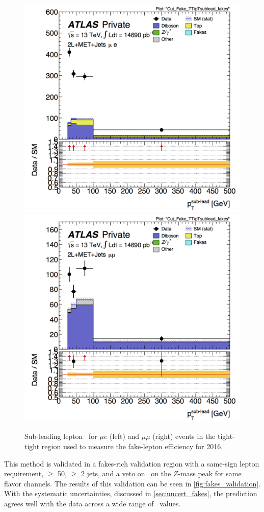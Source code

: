 \begin{centering}
\begin{figure}[htbp]
\centering
\includegraphics[width=.45\textwidth]{figures/fakes/me-Cut_Fake_TT-pTsublead_fakes-lin_2016.png}
\includegraphics[width=.45\textwidth]{figures/fakes/mm-Cut_Fake_TT-pTsublead_fakes-lin_2016.png}
\caption{Sub-leading lepton \pT\ for $\mu e$ (left) and $\mu\mu$ (right) events in the tight-tight region used to measure the fake-lepton efficiency for 2016.}
\label{fig:fake_fakereg}
\end{figure}
\end{centering}

This method is validated in a fakes-rich validation region with a same-sign lepton requirement, \met $\geq$ 50\gev, $\geq$ 2 jets, and a veto on \mll~on the $Z$-mass peak for same flavor channels. The results of this validation can be seen in \autoref{fig:fakes_validation}. With the systematic uncertainties, discussed in \autoref{sec:uncert_fakes}, the prediction agrees well with the data across a wide range of \mll~values. 


